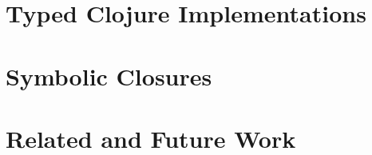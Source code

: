 \documentclass{book}
\begin{document}
%
%
%
%

\part{Typed Clojure Implementations}
\label{part:implementations}


\part{%
Symbolic Closures}
\label{part:symbolic-closures}



\part{Related and Future Work}
\label{part:related-future-work}





\end{document}
